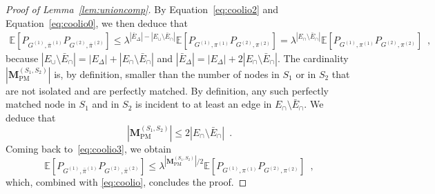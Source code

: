 \documentclass[final]{colt2026}
\newcommand{\1}{\mathbf{1}}
\newcommand{\bbE}{\mathbb{E}}
\newcommand{\cro}[1]{\left[#1\right]}
\begin{document}
\begin{proof}[Proof of Lemma~\ref{lem:unioncomp}]



By Equation~\eqref{eq:coolio2} and Equation~\eqref{eq:coolio0}, we then deduce that 
\begin{align}\label{eq:coolio3}
    \mathbb E\left[P_{G^{(1)}, \bar \pi^{(1)}}P_{G^{(2)}, \bar \pi^{(2)}}\right]\leq \lambda^{|\bar E_\Delta| - |E_\cup\setminus \bar{E}_{\cap}|}\mathbb{E}\left[P_{G^{(1)}, \pi^{(1)}}P_{G^{(2)}, \pi^{(2)}}\right]= \lambda^{|E_{\cap}\setminus \bar E_{\cap}|}\mathbb{E}\left[P_{G^{(1)}, \pi^{(1)}}P_{G^{(2)}, \pi^{(2)}}\right]\enspace ,
\end{align}
because $|E_\cup\setminus \bar{E}_{\cap}|= |E_{\Delta}| + |E_{\cap}\setminus \bar E_{\cap}|$ and $|\bar E_\Delta|= |E_{\Delta}| + 2|E_{\cap}\setminus \bar E_{\cap}|$. The cardinality $|\mathbf M_{\mathrm{PM}}^{(S_1,S_2)}|$ is, by definition, smaller than the number of nodes in $S_1$ or in $S_2$ that are not isolated and are perfectly matched. By definition, any such perfectly matched node in $S_1$ and in $S_2$ is incident to at least an edge in $E_{\cap}\setminus \bar E_{\cap}$. We deduce that 
\[
|\mathbf M_{\mathrm{PM}}^{(S_1,S_2)}|\leq 2|E_\cap \setminus \bar E_\cap|\enspace .
\] 
Coming back to~\eqref{eq:coolio3}, we obtain 
\[
   \mathbb E\left[P_{G^{(1)}, \bar \pi^{(1)}}P_{G^{(2)}, \bar \pi^{(2)}}\right]\leq\lambda^{|\mathbf M_{\mathrm{PM}}^{(S_1,S_2)}|/2}\mathbb{E}\left[P_{G^{(1)}, \pi^{(1)}}P_{G^{(2)}, \pi^{(2)}}\right]\enspace ,
\]
which, combined with \eqref{eq:coolio}, concludes the proof. 

\end{proof}
\end{document}
